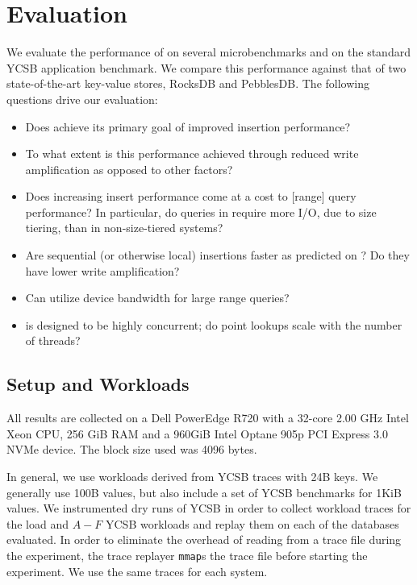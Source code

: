 \section{Evaluation}\label{sec:eval}

We evaluate the performance of \sysname{} on several microbenchmarks and 
on the standard YCSB application benchmark\cite{ycsb}. We compare this
performance against that of two state-of-the-art key-value stores,
RocksDB and PebblesDB.
The following questions drive our evaluation:
\begin{itemize}
   \item Does \sysname achieve its primary goal of improved insertion
      performance?
   \item To what extent is this performance achieved through reduced write
      amplification as opposed to other factors?
   \item Does increasing insert performance come at a cost to [range] query
     performance?  In particular, do queries in \sysname require more I/O, due to
     size tiering, than in non-size-tiered systems?
   \item Are sequential (or otherwise local) insertions faster as predicted on
     \sysname? Do they have lower write amplification?
   \item Can \sysname utilize device bandwidth for large range queries?
   \item \sysname is designed to be highly concurrent; do point lookups scale
      with the number of threads?
\end{itemize}

\subsection{Setup and Workloads}\label{sec:setup}

All results are collected on a Dell PowerEdge R720 with a 32-core
2.00 GHz Intel Xeon CPU, 256 GiB RAM and a 960GiB Intel Optane 905p PCI Express
3.0 NVMe device. The block size used was 4096 bytes.

In general, we use workloads derived from YCSB traces with 24B keys. We
generally use 100B values, but also include a set of YCSB benchmarks for 1KiB
values.  We instrumented dry runs of YCSB in order to collect workload traces
for the load and $A-F$ YCSB workloads and replay them on each of the databases
evaluated.  In order to eliminate the overhead of reading from a trace file
during the experiment, the trace replayer \texttt{mmap}s the trace file before
starting the experiment.  We use the same traces for each system.

